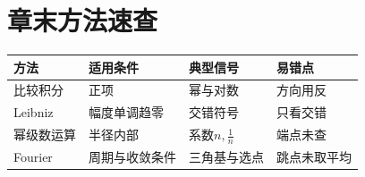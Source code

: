 \section*{章末方法速查}
\par\noindent\begin{tabularx}{\textwidth}{p{23mm}XXX}\toprule 方法&适用条件&典型信号&易错点\\\midrule
比较积分&正项&幂与对数&方向用反\\Leibniz&幅度单调趋零&交错符号&只看交错\\幂级数运算&半径内部&系数$n,\frac{1}{n}$&端点未查\\Fourier&周期与收敛条件&三角基与选点&跳点未取平均\\
\bottomrule\end{tabularx}
